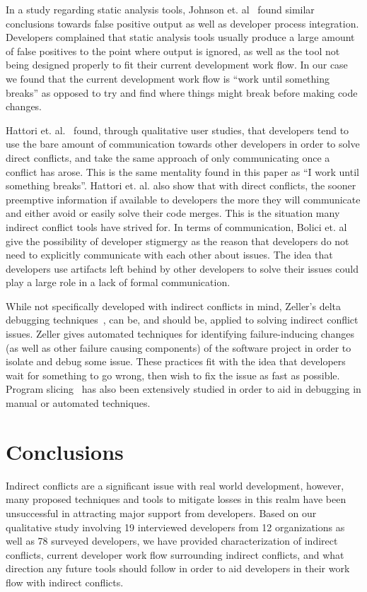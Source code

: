\documentclass[conference]{IEEEtran}
\begin{document}
In a study regarding static analysis tools, Johnson et. al~\cite{Johnson:2013:WDS} found similar conclusions towards false positive output
as well as developer process integration. Developers complained that static analysis tools usually produce a large amount of false
positives to the point where output is ignored, as well as the tool not being designed properly to fit their current development work
flow. In our case we found that the current development work flow is ``work until something breaks'' as opposed to try and find where things
might break before making code changes.

Hattori et. al.~\cite{Hattori:2012:ICG} found, through qualitative user studies, that developers tend to use the bare amount of communication
towards other developers in order to solve direct conflicts, and take the same approach of only communicating once a conflict has arose. This
is the same mentality found in this paper as ``I work until something breaks''. Hattori et. al. also show that with direct conflicts, the
sooner preemptive information if available to developers the more they will communicate and either avoid or easily solve their code merges.
This is the situation many indirect conflict tools have strived for. In terms of communication, Bolici et. al~\cite{Bolici:2009} give the 
possibility of developer stigmergy as the reason that developers do not need to explicitly communicate with each other about issues. The idea
that developers use artifacts left behind by other developers to solve their issues could play a large role in a lack of formal communication.

While not specifically developed with indirect conflicts in mind, Zeller's delta debugging techniques~\cite{Zeller:2005:WPF}, 
can be, and should be, applied to solving indirect conflict issues. Zeller gives automated techniques for identifying failure-inducing
changes (as well as other failure causing components) of the software project in order to isolate and debug some issue. These practices fit
with the idea that developers wait for something to go wrong, then wish to fix the issue as fast as possible. Program slicing~\cite{Xu:2005:BSP}
has also been extensively studied in order to aid in debugging in manual or automated techniques.

\section{Conclusions}
\label{sec:conc}

Indirect conflicts are a significant issue with real world development, however, many proposed techniques and tools to mitigate
losses in this realm have been unsuccessful in attracting major support from developers. Based on our qualitative study involving
19 interviewed developers from 12 organizations as well as 78 surveyed developers, we have provided characterization of indirect conflicts,
current developer work flow surrounding indirect conflicts, and what direction any future tools should follow in order to aid developers
in their work flow with indirect conflicts.
\end{document}
